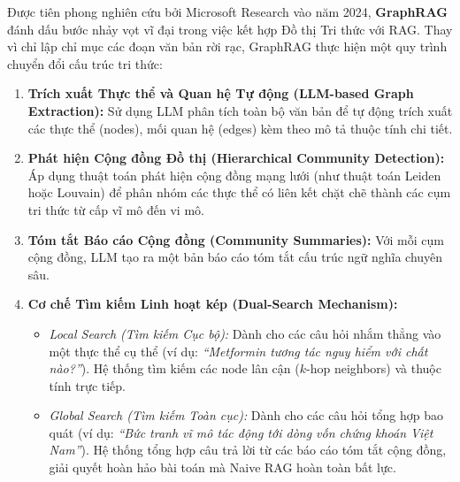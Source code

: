 \documentclass[12pt,a4paper]{report}
\begin{document}
Được tiên phong nghiên cứu bởi Microsoft Research vào năm 2024, \textbf{GraphRAG} đánh dấu bước nhảy vọt vĩ đại trong việc kết hợp Đồ thị Tri thức với RAG. Thay vì chỉ lập chỉ mục các đoạn văn bản rời rạc, GraphRAG thực hiện một quy trình chuyển đổi cấu trúc tri thức:
\begin{enumerate}[itemsep=2pt, parsep=0pt, topsep=3pt]
    \item \textbf{Trích xuất Thực thể và Quan hệ Tự động (LLM-based Graph Extraction):} Sử dụng LLM phân tích toàn bộ văn bản để tự động trích xuất các thực thể (nodes), mối quan hệ (edges) kèm theo mô tả thuộc tính chi tiết.
    \item \textbf{Phát hiện Cộng đồng Đồ thị (Hierarchical Community Detection):} Áp dụng thuật toán phát hiện cộng đồng mạng lưới (như thuật toán Leiden hoặc Louvain) để phân nhóm các thực thể có liên kết chặt chẽ thành các cụm tri thức từ cấp vĩ mô đến vi mô.
    \item \textbf{Tóm tắt Báo cáo Cộng đồng (Community Summaries):} Với mỗi cụm cộng đồng, LLM tạo ra một bản báo cáo tóm tắt cấu trúc ngữ nghĩa chuyên sâu.
    \item \textbf{Cơ chế Tìm kiếm Linh hoạt kép (Dual-Search Mechanism):}
    \begin{itemize}[itemsep=1pt, parsep=0pt, topsep=2pt]
        \item \textit{Local Search (Tìm kiếm Cục bộ):} Dành cho các câu hỏi nhắm thẳng vào một thực thể cụ thể (ví dụ: \textit{“Metformin tương tác nguy hiểm với chất nào?”}). Hệ thống tìm kiếm các node lân cận ($k$-hop neighbors) và thuộc tính trực tiếp.
        \item \textit{Global Search (Tìm kiếm Toàn cục):} Dành cho các câu hỏi tổng hợp bao quát (ví dụ: \textit{“Bức tranh vĩ mô tác động tới dòng vốn chứng khoán Việt Nam”}). Hệ thống tổng hợp câu trả lời từ các báo cáo tóm tắt cộng đồng, giải quyết hoàn hảo bài toán mà Naive RAG hoàn toàn bất lực.
    \end{itemize}
\end{enumerate}
\end{document}
